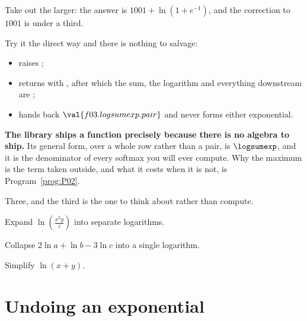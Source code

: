 \begin{fr}
Take out the larger: the answer is $1001 + \ln\!\left(1 + e^{-1}\right)$, and
the correction to $1001$ is under a third.

\begin{aibox}
Try it the direct way and there is nothing to salvage:

\begin{itemize}
\item {} raises ;
\item {} returns  with
  , after which the sum, the
  logarithm and everything downstream are ;
\item {} hands back $\val{f03.logsumexp.pair}$
  and never forms either exponential.
\end{itemize}

\textbf{The library ships a function precisely because there is no algebra to
ship.} Its general form, over a whole row rather than a pair, is
$\logsumexp$, and it is the denominator of every softmax you will ever
compute. Why the maximum is the term taken outside, and what it costs when it
is not, is Program~\ref{prog:P02}.
\end{aibox}
\end{fr}


\begin{fr}
\yourturn
Three, and the third is the one to think about rather than compute.

Expand $\ln\!\left(\frac{x^{2} y}{z}\right)$ into separate logarithms.

Collapse $2\ln a + \ln b - 3\ln c$ into a single logarithm.

Simplify $\ln(x + y)$.
\dotline
\nextframe
\end{fr}

\section{Undoing an exponential}
\label{sec:F03-undoing}

